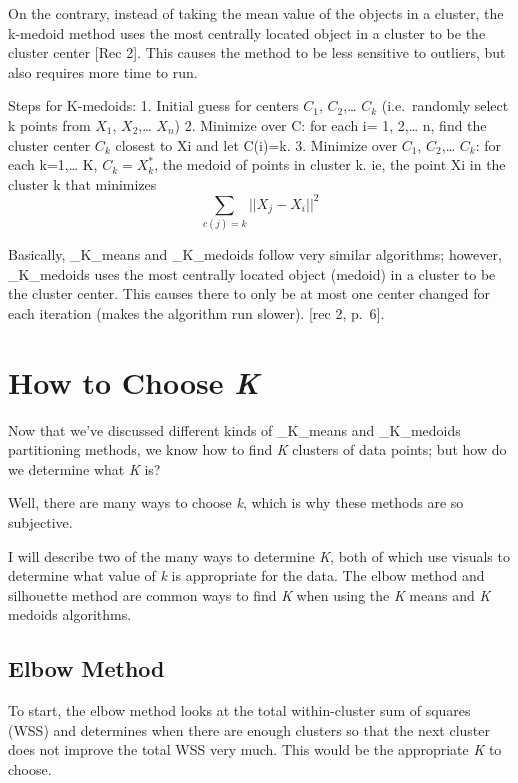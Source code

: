 \documentclass[12pt,twoside]{amherstthesis}
\begin{document}
  On the contrary, instead of taking the mean value of the objects in a
  cluster, the k-medoid method uses the most centrally located object in a
  cluster to be the cluster center {[}Rec 2{]}. This causes the method to
  be less sensitive to outliers, but also requires more time to run.
  
  Steps for K-medoids: 1. Initial guess for centers \(C_1\),
  \(C_2\),\ldots{} \(C_k\) (i.e.~randomly select k points from \(X_1\),
  \(X_2\),\ldots{} \(X_n\)) 2. Minimize over C: for each i= 1, 2,\ldots{}
  n, find the cluster center \(C_k\) closest to Xi and let C(i)=k. 3.
  Minimize over \(C_1\), \(C_2\),\ldots{} \(C_k\): for each k=1,\ldots{}
  K, \(C_k = X_k^*\), the medoid of points in cluster k. ie, the point Xi
  in the cluster k that minimizes \[\sum  _{c(j)=k} ||{{X_j- X_i}}||^2\]
  
  Basically, \_K\_means and \_K\_medoids follow very similar algorithms;
  however, \_K\_medoids uses the most centrally located object (medoid) in
  a cluster to be the cluster center. This causes there to only be at most
  one center changed for each iteration (makes the algorithm run slower).
  {[}rec 2, p.~6{]}.
  
  \section{\texorpdfstring{How to Choose
  \emph{K}}{How to Choose K}}\label{how-to-choose-k}
  
  Now that we've discussed different kinds of \_K\_means and \_K\_medoids
  partitioning methods, we know how to find \emph{K} clusters of data
  points; but how do we determine what \emph{K} is?
  
  Well, there are many ways to choose \emph{k}, which is why these methods
  are so subjective.
  
  I will describe two of the many ways to determine \emph{K}, both of
  which use visuals to determine what value of \emph{k} is appropriate for
  the data. The elbow method and silhouette method are common ways to find
  \emph{K} when using the \emph{K} means and \emph{K} medoids algorithms.
  
  \subsection{Elbow Method}\label{elbow-method}
  
  To start, the elbow method looks at the total within-cluster sum of
  squares (WSS) and determines when there are enough clusters so that the
  next cluster does not improve the total WSS very much. This would be the
  appropriate \emph{K} to choose.
  
\end{document}
